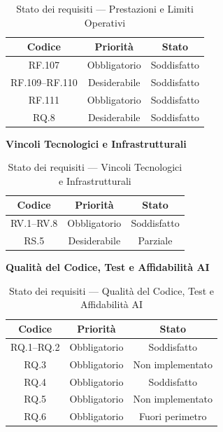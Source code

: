 \documentclass[12pt, a4paper]{article}
\begin{document}
\begin{table}[H]
    \centering
    \renewcommand{\arraystretch}{1.3}
    \begin{tabular}{|c|c|c|}
        \hline
        \textbf{Codice} & \textbf{Priorità} & \textbf{Stato} \\ \hline
        RF.107 & Obbligatorio & Soddisfatto \\ \hline
        RF.109--RF.110 & Desiderabile & Soddisfatto \\ \hline
        RF.111 & Obbligatorio & Soddisfatto \\ \hline
        RQ.8 & Desiderabile & Soddisfatto \\ \hline
    \end{tabular}
    \caption{Stato dei requisiti — Prestazioni e Limiti Operativi}
    \label{tab:req-prestazioni}
\end{table}

\medskip
\noindent\textbf{Vincoli Tecnologici e Infrastrutturali}
\medskip

\begin{table}[H]
    \centering
    \renewcommand{\arraystretch}{1.3}
    \begin{tabular}{|c|c|c|}
        \hline
        \textbf{Codice} & \textbf{Priorità} & \textbf{Stato} \\ \hline
        RV.1--RV.8 & Obbligatorio & Soddisfatto \\ \hline
        RS.5 & Desiderabile & Parziale \\ \hline
    \end{tabular}
    \caption{Stato dei requisiti — Vincoli Tecnologici e Infrastrutturali}
    \label{tab:req-vincoli}
\end{table}

\medskip
\noindent\textbf{Qualità del Codice, Test e Affidabilità AI}
\medskip

\begin{table}[H]
    \centering
    \renewcommand{\arraystretch}{1.3}
    \begin{tabular}{|c|c|c|}
        \hline
        \textbf{Codice} & \textbf{Priorità} & \textbf{Stato} \\ \hline
        RQ.1--RQ.2 & Obbligatorio & Soddisfatto \\ \hline
        RQ.3 & Obbligatorio & Non implementato \\ \hline
        RQ.4 & Obbligatorio & Soddisfatto \\ \hline
        RQ.5 & Obbligatorio & Non implementato \\ \hline
        RQ.6 & Obbligatorio & Fuori perimetro \\ \hline
    \end{tabular}
    \caption{Stato dei requisiti — Qualità del Codice, Test e Affidabilità AI}
    \label{tab:req-qualita-codice}
\end{table}
\end{document}
